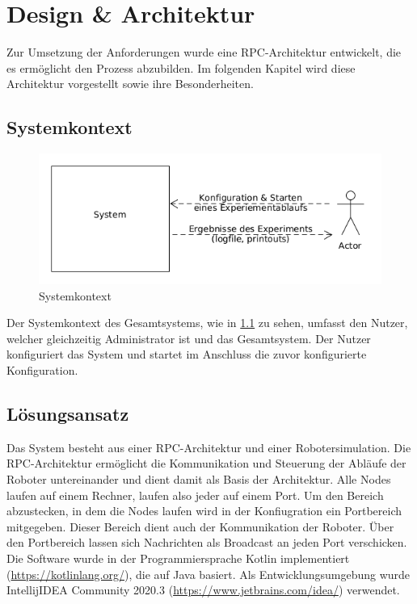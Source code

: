 %
\chapter{Design \& Architektur}

Zur Umsetzung der Anforderungen wurde eine RPC-Architektur entwickelt, die es ermöglicht den Prozess
abzubilden. Im folgenden Kapitel wird diese Architektur vorgestellt sowie ihre Besonderheiten.

\section{Systemkontext}

\begin{figure}[h]
 \includegraphics[width=\textwidth]{../diagrams/1_systemkontext.png}
 \caption{Systemkontext}
 \label{fig:systemkontext}
\end{figure}

Der Systemkontext des Gesamtsystems, wie in \ref{fig:systemkontext} zu sehen,
umfasst den Nutzer, welcher gleichzeitig Administrator ist und das Gesamtsystem.
Der Nutzer konfiguriert das System und startet im Anschluss die zuvor konfigurierte Konfiguration.
\clearpage

\section{Lösungsansatz}
\label{loesungsansatz}

Das System besteht aus einer RPC-Architektur und einer Robotersimulation. Die RPC-Architektur ermöglicht
die Kommunikation und Steuerung der Abläufe der Roboter untereinander und dient damit als Basis der
Architektur. Alle Nodes laufen auf einem Rechner, laufen also jeder auf einem Port.
Um den Bereich abzustecken, in dem die Nodes laufen wird in der Konfiugration ein Portbereich mitgegeben.
Dieser Bereich dient auch der Kommunikation der Roboter. Über den Portbereich lassen sich Nachrichten
als Broadcast an jeden Port verschicken.
Die Software wurde in der Programmiersprache \glqq Kotlin\grqq{} implementiert 
(\url{https://kotlinlang.org/}), die auf Java basiert. Als Entwicklungsumgebung wurde
IntellijIDEA Community 2020.3 (\url{https://www.jetbrains.com/idea/}) verwendet.

